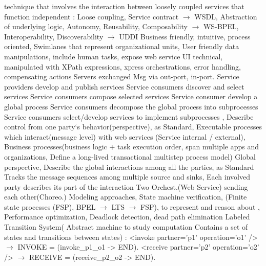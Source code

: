 technique that involves the interaction between loosely coupled services that function independent
:
Loose coupling,
Service contract $\rightarrow$ WSDL,
Abstraction of underlying logic,
Autonomy,
Reusability,
Composability $\rightarrow$ WS-BPEL,
Interoperability,
Discoverability $\rightarrow$ UDDI
\textbar
{}
Business friendly,
intuitive,
process oriented,
Swimlanes that represent organizational units,
User friendly data manipulations,
include human tasks,
expose web service UI
technical,
manipulated with XPath expressions,
xpress orchestrations,
error handling,
compensating actions
\textbar
{}
 Servers exchanged Msg via out-port, in-port.
Service providers develop and publish services
Service consumers discover and select services
Service consumers compose selected services
Service consumer develop a global process
Service consumers decompose the global process into subprocesses
Service consumers select/develop services to implement subprocesses
\textbar
{}
,
Describe control from one party‘s behavior(perspective),
 as Standard,
Executable processes which interact(message level) with web services
(Service internal / external),
Business processes(business logic $+$ task execution order,
span multiple apps and organizations,
Define a long-lived transactional multistep process model)
\textbar
{}
Global perspective,
Describe the global interactions among all the parties,
 as Standard
Tracks the message sequences among multiple source and sinks,
Each involved party describes its part of the interaction
\textbar
{} Two Orchest.(Web Service) sending each other(Choreo.) 
\textbar
{}
Modeling approaches, State machine verification,
(Finite state processes (FSP), BPEL $\rightarrow$ LTS $\rightarrow$ FSP),
to represent and reason about ,
Performance optimization,
Deadlock detection, 
dead path elimination
\textbar
{}
Labeled Transition System(
Abstract machine to study computation
Contains a set of states and transitions between states)
\textbar
{}
:
<invoke partner='p1' operation='o1' /> $\rightarrow$ INVOKE = (invoke\_p1\_o1 -> END).
<receive partner='p2' operation='o2' /> $\rightarrow$ RECEIVE = (receive\_p2\_o2 -> END).
